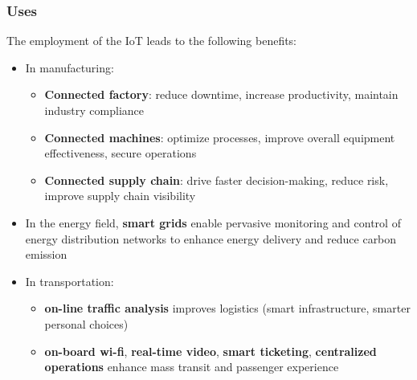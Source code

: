 \documentclass{beamer}
\begin{document}
\begin{frame}
	\frametitle{Uses}
	The employment of the IoT leads to the following benefits:
	\begin{itemize}
		\item In manufacturing:
		\begin{itemize}
			\item\textbf{Connected factory}: reduce downtime, increase productivity, maintain industry compliance
			\item \textbf{Connected machines}: optimize processes, improve overall equipment effectiveness, secure operations
			\item \textbf{Connected supply chain}: drive faster decision-making, reduce risk, improve supply chain visibility
		\end{itemize}
	\item In the energy field, \textbf{smart grids} enable pervasive monitoring and control of energy distribution networks to enhance energy delivery and reduce carbon emission
	\item In transportation:
	\begin{itemize}
		\item \textbf{on-line traffic analysis} improves logistics (smart infrastructure, smarter personal choices)
		\item \textbf{on-board wi-fi}, \textbf{real-time video}, \textbf{smart ticketing}, \textbf{centralized operations} enhance mass transit and passenger experience
	\end{itemize}
	\end{itemize}
\end{frame}
\end{document}
